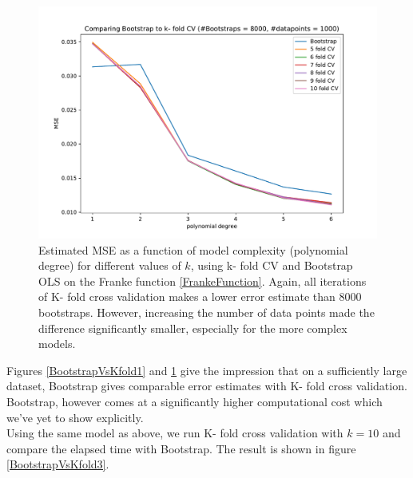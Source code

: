 \documentclass[11pt,a4paper,titlepage]{article}
\begin{document}
\begin{figure}[H]
\centering

\includegraphics[trim=1cm 0.2cm 1.5cm 1.2cm, clip=true,scale = 0.6]{KfoldVsBootstrap_k5to10_8kBootstraps_1000dps.pdf}
\caption[Comparing Error estimates from Bootstrap vs. K- fold CV -1000 data points]{Estimated MSE as a function of model complexity (polynomial degree) for different values of $k$, using k- fold CV and Bootstrap OLS on the Franke function \eqref{FrankeFunction}. Again, all iterations of K- fold cross validation makes a lower error estimate than 8000 bootstraps. However, increasing the number of data points made the difference significantly smaller, especially for the more complex models.}\label{BootstrapVsKfold2}
\end{figure}
Figures \ref{BootstrapVsKfold1} and \ref{BootstrapVsKfold2} give the impression that on a sufficiently large dataset, Bootstrap gives comparable error estimates with K- fold cross validation. Bootstrap, however comes at a significantly higher computational cost which we've yet to show explicitly.\\Using the same model as above, we run K- fold cross validation with $k=10$ and compare the elapsed time with Bootstrap. The result is shown in figure \ref{BootstrapVsKfold3}.
\end{document}
